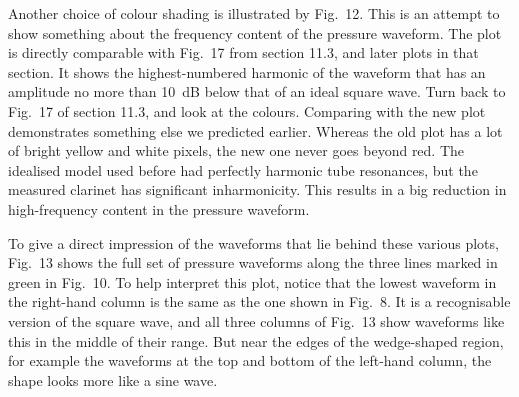   Another choice of colour shading is illustrated by Fig.\ 12. This is an 
  attempt to show something about the frequency content of the pressure 
  waveform. The plot is directly comparable with Fig.\ 17 from section 11.3, 
  and later plots in that section. It shows the highest-numbered harmonic of 
  the waveform that has an amplitude no more than 10~dB below that of an ideal 
  square wave. Turn back to Fig.\ 17 of section 11.3, and look at the colours. 
  Comparing with the new plot demonstrates something else we predicted earlier. 
  Whereas the old plot has a lot of bright yellow and white pixels, the new one 
  never goes beyond red. The idealised model used before had perfectly harmonic 
  tube resonances, but the measured clarinet has significant inharmonicity. 
  This results in a big reduction in high-frequency content in the pressure 
  waveform. 


  To give a direct impression of the waveforms that lie behind these various 
  plots, Fig.\ 13 shows the full set of pressure waveforms along the three 
  lines marked in green in Fig.\ 10. To help interpret this plot, notice that 
  the lowest waveform in the right-hand column is the same as the one shown in 
  Fig.\ 8. It is a recognisable version of the square wave, and all three 
  columns of Fig.\ 13 show waveforms like this in the middle of their range. 
  But near the edges of the wedge-shaped region, for example the waveforms at 
  the top and bottom of the left-hand column, the shape looks more like a sine 
  wave. 


